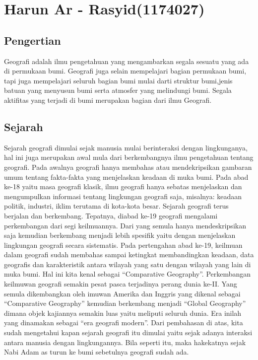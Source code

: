 \section{Harun Ar - Rasyid(1174027)}
\subsection{Pengertian}
Geografi adalah ilmu pengetahuan yang mengambarkan segala sesuatu yang ada di permukaan bumi. \hfill\break
Geografi juga selain mempelajari bagian permukaan bumi, tapi juga mempelajari seluruh bagian bumi mulai darti struktur bumi,jenis batuan yang menyusun bumi serta atmosfer yang melindungi bumi. \hfill\break
Segala aktifitas yang terjadi di bumi merupakan bagian dari ilmu Geografi.\hfill\break
\subsection{Sejarah}
Sejarah geografi dimulai sejak manusia mulai berinteraksi dengan lingkunganya, hal ini juga merupakan awal mula dari berkembangnya ilmu pengetahuan tentang geografi.\hfill\break
Pada awalnya geografi hanya membahas atau mendekripsikan gambaran umum tentang fakta-fakta yang menjelaskan keadaan di muka bumi. Pada abad ke-18 yaitu masa geografi klasik, ilmu geografi hanya sebatas menjelaskan dan mengumpulkan informasi tentang lingkungan geografi saja, misalnya: keadaan politik, industri, iklim terutama di kota-kota besar.\hfill\break
Sejarah geografi terus berjalan dan berkembang. Tepatnya, diabad ke-19 geografi mengalami perkembangan dari segi keilmuannya. Dari yang semula hanya mendeskripsikan saja kemudian berkembang menjadi lebih spesifik yaitu dengan menjelaskan lingkungan geografi secara sistematis.\hfill\break
Pada pertengahan abad ke-19, keilmuan dalam geografi sudah membahas sampai ketingkat membandingkan keadaan, data geografis dan karakteristik antara wilayah yang satu dengan wilayah yang lain di muka bumi. Hal ini kita kenal sebagai “Comparative Geography”.\hfill\break
Perkembangan keilmuwan geografi semakin pesat pasca terjadinya perang dunia ke-II. Yang semula dikembangkan oleh imuwan Amerika dan Inggris yang dikenal sebagai “Comparative Geography” kemudian berkembang menjadi “Global Geography” dimana objek kajiannya semakin luas yaitu meliputi seluruh dunia. Era inilah yang dinamakan sebagai “era geografi modern”.\hfill\break
Dari pembahasan di atas, kita sudah mengetahui kapan sejarah geografi itu dimulai yaitu sejak adanya interaksi antara manusia dengan lingkungannya. Bila seperti itu, maka hakekatnya sejak Nabi Adam as turun ke bumi sebetulnya geografi sudah ada.\hfill\break
